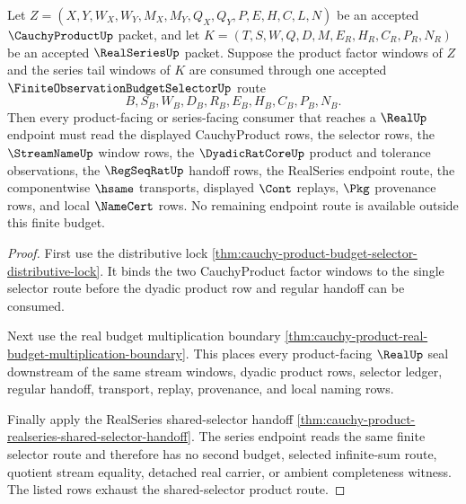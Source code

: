 \begin{theorem}
\label{thm:cauchy-product-shared-selector-budget-totality}
Let $Z=(X,Y,W_X,W_Y,M_X,M_Y,Q_X,Q_Y,P,E,H,C,L,N)$ be an accepted $\CauchyProductUp$ packet, and let $K=(T,S,W,Q,D,M,E_R,H_R,C_R,P_R,N_R)$ be an accepted $\RealSeriesUp$ packet. Suppose the product factor windows of $Z$ and the series tail windows of $K$ are consumed through one accepted $\FiniteObservationBudgetSelectorUp$ route
$$
B,S_B,W_B,D_B,R_B,E_B,H_B,C_B,P_B,N_B .
$$
Then every product-facing or series-facing consumer that reaches a $\RealUp$ endpoint must read the displayed CauchyProduct rows, the selector rows, the $\StreamNameUp$ window rows, the $\DyadicRatCoreUp$ product and tolerance observations, the $\RegSeqRatUp$ handoff rows, the RealSeries endpoint route, the componentwise $\hsame$ transports, displayed $\Cont$ replays, $\Pkg$ provenance rows, and local $\NameCert$ rows. No remaining endpoint route is available outside this finite budget.
\end{theorem}
\begin{proof}
First use the distributive lock \autoref{thm:cauchy-product-budget-selector-distributive-lock}. It binds the two CauchyProduct factor windows to the single selector route before the dyadic product row and regular handoff can be consumed.

Next use the real budget multiplication boundary \autoref{thm:cauchy-product-real-budget-multiplication-boundary}. This places every product-facing $\RealUp$ seal downstream of the same stream windows, dyadic product rows, selector ledger, regular handoff, transport, replay, provenance, and local naming rows.

Finally apply the RealSeries shared-selector handoff \autoref{thm:cauchy-product-realseries-shared-selector-handoff}. The series endpoint reads the same finite selector route and therefore has no second budget, selected infinite-sum route, quotient stream equality, detached real carrier, or ambient completeness witness. The listed rows exhaust the shared-selector product route.
\end{proof}

